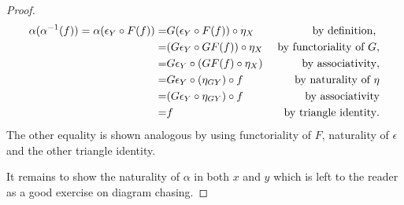 \begin{thm}
\begin{proof}
\begin{eqnarray*}
\alpha(\alpha^{-1}(f)) = \alpha(\co{F(f)}{\epsilon_Y}) =& \co{\eta_X}{G(\co{F(f)}{\epsilon_Y})} &\text{ by definition, }\\
	=& \co{\eta_X}{(\co{GF(f)}{G\epsilon_Y})} &\text{ by functoriality of $G$},\\
	=& \co{(\co{\eta_X}{GF(f)})}{G\epsilon_Y} &\text{ by associativity},\\
	=& \co{(\co{f}{\eta_{GY})}}{G\epsilon_Y} &\text{ by naturality of $\eta$}\\
	=& \co{f}{(\co{\eta_{GY}}{G\epsilon_Y})} &\text{ by associativity}\\
	=& f &\text{by triangle identity}.
\end{eqnarray*}
The other equality is shown analogous by using functoriality of $F$, naturality of $\epsilon$ and the other triangle identity.

It remains to show the naturality of $\alpha$ in both $x$ and $y$ which is left to the reader as a good exercise on diagram chasing. %
\end{proof}
\end{thm}
